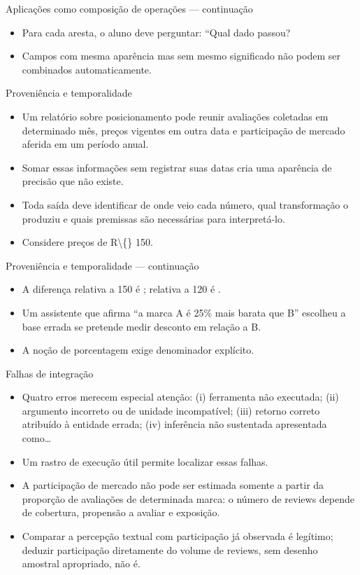 \documentclass[10pt,aspectratio=169]{beamer}
\begin{document}
\begin{frame}[t]{Aplicações como composição de operações — continuação}
\small
\begin{itemize}
\item Para cada aresta, o aluno deve perguntar: ``Qual dado passou?
\item Campos com mesma aparência mas sem mesmo significado não podem ser combinados automaticamente.
\end{itemize}
\end{frame}

\begin{frame}[t]{Proveniência e temporalidade}
\small
\begin{itemize}
\item Um relatório sobre posicionamento pode reunir avaliações coletadas em determinado mês, preços vigentes em outra data e participação de mercado aferida em um período anual.
\item Somar essas informações sem registrar suas datas cria uma aparência de precisão que não existe.
\item Toda saída deve identificar de onde veio cada número, qual transformação o produziu e quais premissas são necessárias para interpretá-lo.
\item Considere preços de R\textbackslash\{\} 150.
\end{itemize}
\end{frame}

\begin{frame}[t]{Proveniência e temporalidade — continuação}
\small
\begin{itemize}
\item A diferença relativa a 150 é ; relativa a 120 é .
\item Um assistente que afirma ``a marca A é 25\% mais barata que B'' escolheu a base errada se pretende medir desconto em relação a B.
\item A noção de porcentagem exige denominador explícito.
\end{itemize}
\end{frame}

\begin{frame}[t]{Falhas de integração}
\small
\begin{itemize}
\item Quatro erros merecem especial atenção: (i) ferramenta não executada; (ii) argumento incorreto ou de unidade incompatível; (iii) retorno correto atribuído à entidade errada; (iv) inferência não sustentada apresentada como…
\item Um rastro de execução útil permite localizar essas falhas.
\item A participação de mercado não pode ser estimada somente a partir da proporção de avaliações de determinada marca: o número de reviews depende de cobertura, propensão a avaliar e exposição.
\item Comparar a percepção textual com participação já observada é legítimo; deduzir participação diretamente do volume de reviews, sem desenho amostral apropriado, não é.
\end{itemize}
\end{frame}
\end{document}
